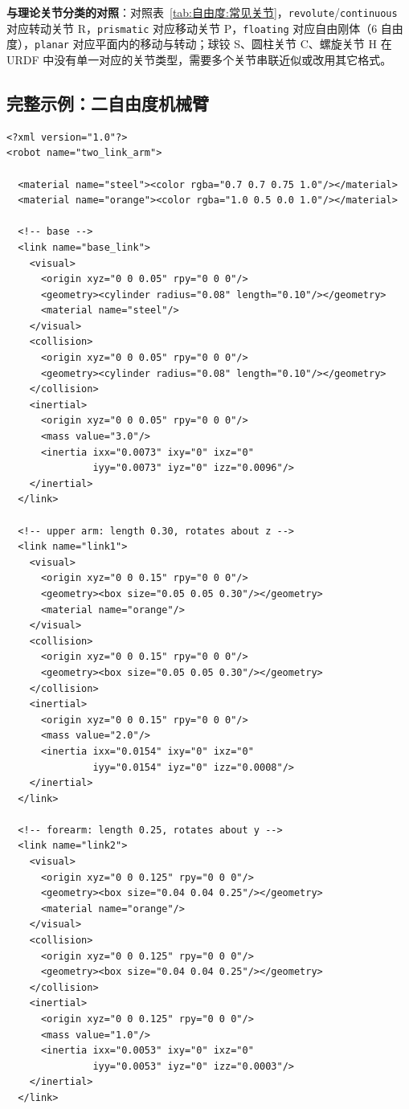 \textbf{与理论关节分类的对照}：对照表~\ref{tab:自由度:常见关节}，\texttt{revolute}/\texttt{continuous} 对应转动关节 R，\texttt{prismatic} 对应移动关节 P，\texttt{floating} 对应自由刚体（6 自由度），\texttt{planar} 对应平面内的移动与转动；球铰 S、圆柱关节 C、螺旋关节 H 在 URDF 中没有单一对应的关节类型，需要多个关节串联近似或改用其它格式。

\subsection{完整示例：二自由度机械臂}

\begin{lstlisting}[style=xml]
<?xml version="1.0"?>
<robot name="two_link_arm">

  <material name="steel"><color rgba="0.7 0.7 0.75 1.0"/></material>
  <material name="orange"><color rgba="1.0 0.5 0.0 1.0"/></material>

  <!-- base -->
  <link name="base_link">
    <visual>
      <origin xyz="0 0 0.05" rpy="0 0 0"/>
      <geometry><cylinder radius="0.08" length="0.10"/></geometry>
      <material name="steel"/>
    </visual>
    <collision>
      <origin xyz="0 0 0.05" rpy="0 0 0"/>
      <geometry><cylinder radius="0.08" length="0.10"/></geometry>
    </collision>
    <inertial>
      <origin xyz="0 0 0.05" rpy="0 0 0"/>
      <mass value="3.0"/>
      <inertia ixx="0.0073" ixy="0" ixz="0"
               iyy="0.0073" iyz="0" izz="0.0096"/>
    </inertial>
  </link>

  <!-- upper arm: length 0.30, rotates about z -->
  <link name="link1">
    <visual>
      <origin xyz="0 0 0.15" rpy="0 0 0"/>
      <geometry><box size="0.05 0.05 0.30"/></geometry>
      <material name="orange"/>
    </visual>
    <collision>
      <origin xyz="0 0 0.15" rpy="0 0 0"/>
      <geometry><box size="0.05 0.05 0.30"/></geometry>
    </collision>
    <inertial>
      <origin xyz="0 0 0.15" rpy="0 0 0"/>
      <mass value="2.0"/>
      <inertia ixx="0.0154" ixy="0" ixz="0"
               iyy="0.0154" iyz="0" izz="0.0008"/>
    </inertial>
  </link>

  <!-- forearm: length 0.25, rotates about y -->
  <link name="link2">
    <visual>
      <origin xyz="0 0 0.125" rpy="0 0 0"/>
      <geometry><box size="0.04 0.04 0.25"/></geometry>
      <material name="orange"/>
    </visual>
    <collision>
      <origin xyz="0 0 0.125" rpy="0 0 0"/>
      <geometry><box size="0.04 0.04 0.25"/></geometry>
    </collision>
    <inertial>
      <origin xyz="0 0 0.125" rpy="0 0 0"/>
      <mass value="1.0"/>
      <inertia ixx="0.0053" ixy="0" ixz="0"
               iyy="0.0053" iyz="0" izz="0.0003"/>
    </inertial>
  </link>


\end{lstlisting}
